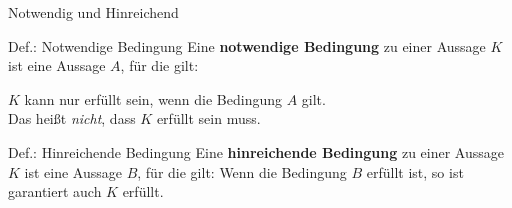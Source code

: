 \begin{frame}{Notwendig und Hinreichend}
	\begin{block}{Def.: Notwendige Bedingung}
		Eine \textbf{notwendige Bedingung} zu einer Aussage $K$ ist eine Aussage $A$, für die gilt:

		{\center $K$ kann nur erfüllt sein, wenn die Bedingung $A$ gilt.}
		\\[0.5em]
		Das heißt \textit{nicht}, dass $K$ erfüllt sein muss.
	\end{block}

	\begin{block}{Def.: Hinreichende Bedingung}
		Eine \textbf{hinreichende Bedingung} zu einer Aussage $K$ ist eine Aussage $B$, für die gilt:
		\center Wenn die Bedingung $B$ erfüllt ist, so ist garantiert auch $K$ erfüllt.
	\end{block}
\end{frame}